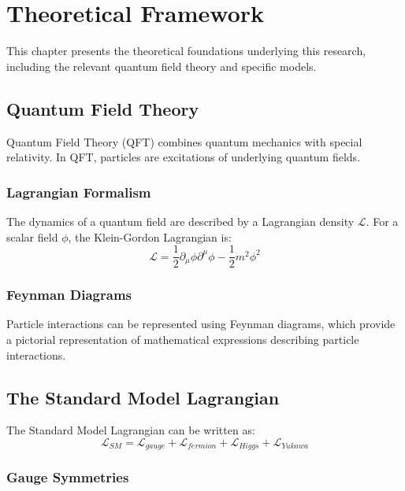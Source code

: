 \chapter{Theoretical Framework}
\label{ch:theory}

This chapter presents the theoretical foundations underlying this research, including the relevant quantum field theory and specific models.

\section{Quantum Field Theory}

Quantum Field Theory (QFT) combines quantum mechanics with special relativity. In QFT, particles are excitations of underlying quantum fields.

\subsection{Lagrangian Formalism}

The dynamics of a quantum field are described by a Lagrangian density $\mathcal{L}$. For a scalar field $\phi$, the Klein-Gordon Lagrangian is:
\begin{equation}
  \mathcal{L} = \frac{1}{2}\partial_\mu\phi\partial^\mu\phi - \frac{1}{2}m^2\phi^2
  \label{eq:klein-gordon}
\end{equation}

\subsection{Feynman Diagrams}

Particle interactions can be represented using Feynman diagrams, which provide a pictorial representation of mathematical expressions describing particle interactions.

\section{The Standard Model Lagrangian}

The Standard Model Lagrangian can be written as:
\begin{equation}
  \mathcal{L}_{SM} = \mathcal{L}_{gauge} + \mathcal{L}_{fermion} + \mathcal{L}_{Higgs} + \mathcal{L}_{Yukawa}
  \label{eq:sm-lagrangian}
\end{equation}

\subsection{Gauge Symmetries}

